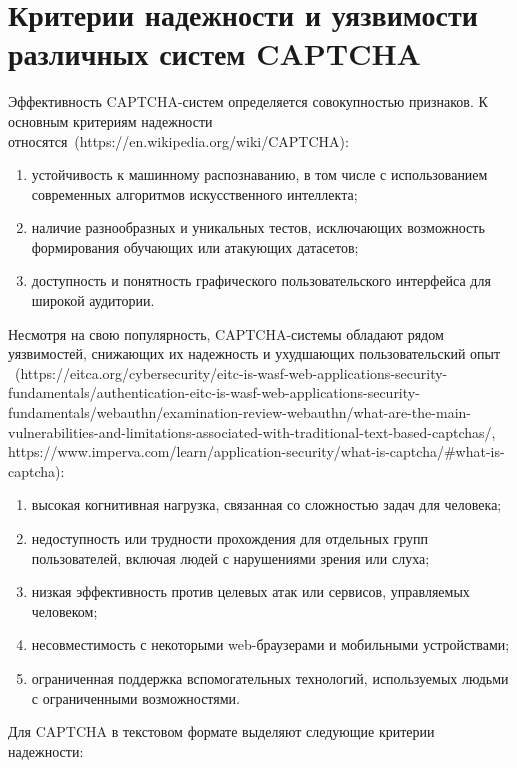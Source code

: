 \section{Критерии надежности и уязвимости различных систем CAPTCHA}

Эффективность CAPTCHA-систем определяется совокупностью признаков. К основным 
критериям надежности относятся~(https://en.wikipedia.org/wiki/CAPTCHA):

\begin{enumerate}
    \item устойчивость к машинному распознаванию, в том числе с использованием 
    современных алгоритмов искусственного интеллекта;
    \item наличие разнообразных и уникальных тестов, исключающих возможность 
    формирования обучающих или атакующих датасетов;
    \item доступность и понятность графического пользовательского интерфейса для 
    широкой аудитории.
\end{enumerate}

Несмотря на свою популярность, CAPTCHA-системы обладают рядом уязвимостей, 
снижающих их надежность и ухудшающих пользовательский опыт
~(https://eitca.org/cybersecurity/eitc-is-wasf-web-applications-security-fundamentals/authentication-eitc-is-wasf-web-applications-security-fundamentals/webauthn/examination-review-webauthn/what-are-the-main-vulnerabilities-and-limitations-associated-with-traditional-text-based-captchas/,
https://www.imperva.com/learn/application-security/what-is-captcha/\#what-is-captcha):

\begin{enumerate}
    \item высокая когнитивная нагрузка, связанная со сложностью задач для 
    человека;
    \item недоступность или трудности прохождения для отдельных групп 
    пользователей, включая людей с нарушениями зрения или слуха;
    \item низкая эффективность против целевых атак или сервисов, управляемых 
    человеком;
    \item несовместимость с некоторыми web-браузерами и мобильными устройствами;
    \item ограниченная поддержка вспомогательных технологий, используемых людьми 
    с ограниченными возможностями.
\end{enumerate}

Для CAPTCHA в текстовом формате выделяют следующие критерии надежности:

